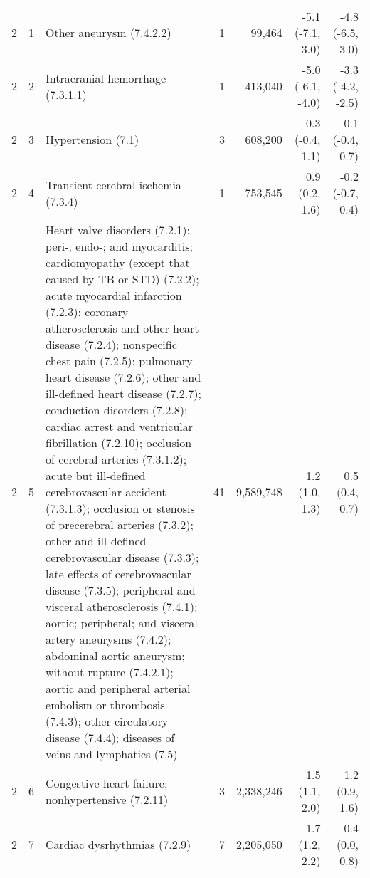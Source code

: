\begin{tabular}{llp{6.5cm}rrrr}
   2 &  1 & Other aneurysm (7.4.2.2) &  1 & 99,464 & -5.1 (-7.1, -3.0) & -4.8 (-6.5, -3.0) \\ 
   2 &  2 & Intracranial hemorrhage (7.3.1.1) &  1 & 413,040 & -5.0 (-6.1, -4.0) & -3.3 (-4.2, -2.5) \\ 
   2 &  3 & Hypertension (7.1) &  3 & 608,200 & 0.3 (-0.4, 1.1) & 0.1 (-0.4, 0.7) \\ 
   2 &  4 & Transient cerebral ischemia (7.3.4) &  1 & 753,545 & 0.9 (0.2, 1.6) & -0.2 (-0.7, 0.4) \\ 
   2 &  5 & Heart valve disorders (7.2.1); peri-; endo-; and myocarditis; cardiomyopathy (except that caused by TB or STD) (7.2.2); acute myocardial infarction (7.2.3); coronary atherosclerosis and other heart disease (7.2.4); nonspecific chest pain (7.2.5); pulmonary heart disease (7.2.6); other and ill-defined heart disease (7.2.7); conduction disorders (7.2.8); cardiac arrest and ventricular fibrillation (7.2.10); occlusion of cerebral arteries (7.3.1.2); acute but ill-defined cerebrovascular accident (7.3.1.3); occlusion or stenosis of precerebral arteries (7.3.2); other and ill-defined cerebrovascular disease (7.3.3); late effects of cerebrovascular disease (7.3.5); peripheral and visceral atherosclerosis (7.4.1); aortic; peripheral; and visceral artery aneurysms (7.4.2); abdominal aortic aneurysm; without rupture (7.4.2.1); aortic and peripheral arterial embolism or thrombosis (7.4.3); other circulatory disease (7.4.4); diseases of veins and lymphatics (7.5) & 41 & 9,589,748 & 1.2 (1.0, 1.3) & 0.5 (0.4, 0.7) \\ 
   2 &  6 & Congestive heart failure; nonhypertensive (7.2.11) &  3 & 2,338,246 & 1.5 (1.1, 2.0) & 1.2 (0.9, 1.6) \\ 
   2 &  7 & Cardiac dysrhythmias (7.2.9) &  7 & 2,205,050 & 1.7 (1.2, 2.2) & 0.4 (0.0, 0.8) \\ 
   \hline
\end{tabular}

